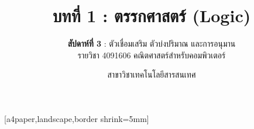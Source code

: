 \def\HANDOUTMODE{}

\usepackage{pgfpages}
[a4paper,landscape,border shrink=5mm]
\renewcommand{\footchaptertitle}{บทที่ 1 ตรรกศาสตร์ (สัปดาห์ที่ 3) — Handout}

\title{\textbf{บทที่ 1 : ตรรกศาสตร์ (Logic)}}
\subtitle{\textbf{สัปดาห์ที่ 3} : ตัวเชื่อมเสริม ตัวบ่งปริมาณ และการอนุมาน \\ รายวิชา 4091606 คณิตศาสตร์สำหรับคอมพิวเตอร์}
\author{สาขาวิชาเทคโนโลยีสารสนเทศ}
\date{}




